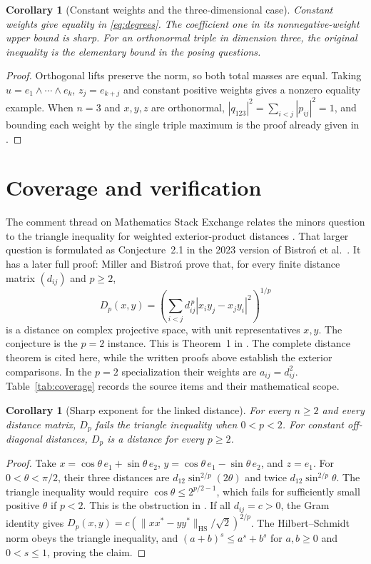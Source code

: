 \documentclass[11pt]{article}
\newtheorem{corollary}[theorem]{Corollary}
\begin{document}
\begin{corollary}[Constant weights and the three-dimensional case]\label{cor:sharp}
Constant weights give equality in \eqref{eq:degrees}.
The coefficient one in its nonnegative-weight upper bound is sharp.
For an orthonormal triple in dimension three, the original inequality
is the elementary bound in the posing questions.
\end{corollary}
\begin{proof}
Orthogonal lifts preserve the norm, so both total masses are equal.
Taking $u=e_1\wedge\cdots\wedge e_k$, $z_j=e_{k+j}$ and constant
positive weights gives a nonzero equality example. When $n=3$ and
$x,y,z$ are orthonormal, $|q_{123}|^2=\sum_{i<j}|p_{ij}|^2=1$,
and bounding each weight by the single triple maximum is the proof
already given in \cite{mo,mse}.
\end{proof}

\section{Coverage and verification}
The comment thread on Mathematics Stack Exchange relates the minors
question to the triangle inequality for weighted exterior-product distances
\cite{mse}. That larger question is formulated as Conjecture~2.1 in the
2023 version of Bistro\'n et al.\ \cite{distances}. It has a later full proof:
Miller and Bistro\'n \cite[Theorem~2]{mb1} prove that, for every finite
distance matrix $(d_{ij})$ and $p\ge2$,
\[
 D_p(x,y)=\left(\sum_{i<j}d_{ij}^{\,p}|x_i y_j-x_j y_i|^2\right)^{1/p}
\]
is a distance on complex projective space, with unit representatives $x,y$.
The conjecture is the $p=2$ instance. This is Theorem~1 in \cite{mb4}.
The complete distance theorem is cited here, while the written proofs above
establish the exterior comparisons. In the $p=2$ specialization their
weights are $a_{ij}=d_{ij}^2$.
Table~\ref{tab:coverage} records the source items and their mathematical scope.

\begin{corollary}[Sharp exponent for the linked distance]\label{cor:exponent}
For every $n\ge2$ and every distance matrix, $D_p$ fails the triangle
inequality when $0<p<2$. For constant off-diagonal distances,
$D_p$ is a distance for every $p\ge2$.
\end{corollary}
\begin{proof}
Take $x=\cos\theta\,e_1+\sin\theta\,e_2$,
$y=\cos\theta\,e_1-\sin\theta\,e_2$, and $z=e_1$.
For $0<\theta<\pi/2$, their three distances are
$d_{12}\sin^{2/p}(2\theta)$ and twice $d_{12}\sin^{2/p}\theta$.
The triangle inequality would require
$\cos\theta\le2^{p/2-1}$, which fails for sufficiently small positive
$\theta$ if $p<2$. This is the obstruction in \cite[Remark~4]{mb1,mb4}.
If all $d_{ij}=c>0$, the Gram identity gives
$D_p(x,y)=c(\|xx^*-yy^*\|_{\mathrm{HS}}/\sqrt2)^{2/p}$.
The Hilbert--Schmidt norm obeys the triangle inequality, and
$(a+b)^s\le a^s+b^s$ for $a,b\ge0$ and $0<s\le1$, proving the claim.
\end{proof}
\end{document}

